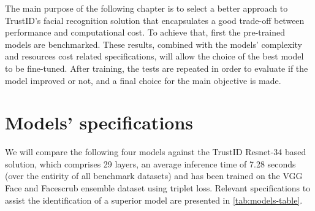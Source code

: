 \documentclass[class=report, crop=false, a4paper, 12pt]{standalone}
\begin{document}
The main purpose of the following chapter is to select a better approach to TrustID's facial recognition solution that encapsulates a good trade-off between performance and computational cost. To achieve that, first the pre-trained models are benchmarked. These results, combined with the models' complexity and resources cost related specifications, will allow the choice of the best model to be fine-tuned. After training, the tests are repeated in order to evaluate if the model improved or not, and a final choice for the main objective is made.

\section{Models' specifications}
\par We will compare the following four models against the TrustID Resnet-34 based solution, which comprises 29 layers, an average inference time of 7.28 seconds (over the entirity of all benchmark datasets) and has been trained on the VGG Face and Facescrub ensemble dataset using triplet loss. Relevant specifications to assist the identification of a superior model are presented in \autoref{tab:models-table}. 

\begin{table}[H]
    \caption{Model's characteristics. ``\# Parameter'' refers to the trainable parameters, ``\# Mult-Adds'' to the number of multiplication and addition operations, ``\# Layers'' denotes the quantity of convolutional and linear layers present in the model, ``Embedding'' signifies the dimensionality of the feature embedding produced by the model's output, ``Inference time (s)'' represents the average time taken for inference of all images from all the benchmark datasets, ``Loss'' is the loss function used to train the model, and ``Dataset'' are the training images.}
    \label{tab:models-table}
\end{table}
\end{document}
